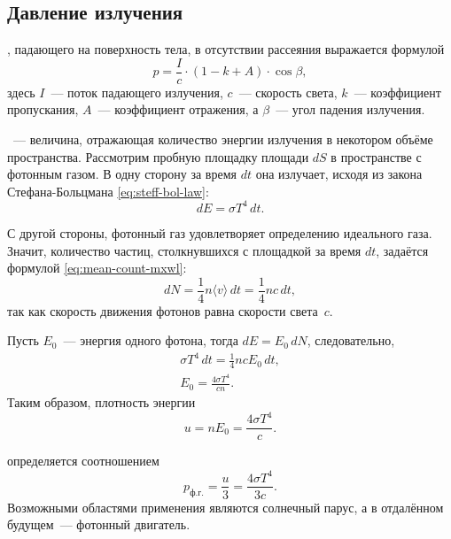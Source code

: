 \subsection{Давление излучения}
\label{sec:light-pressure}
, падающего на поверхность тела, в отсутствии рассеяния выражается формулой
\begin{equation}
    p = \frac{I}{c} \cdot (1 - k + A) \cdot \cos \beta,
\end{equation}
здесь $I$~--- поток падающего излучения, $c$~--- скорость света, $k$~--- коэффициент пропускания, $A$~--- коэффициент отражения, а $\beta$~--- угол падения излучения.

~--- величина, отражающая количество энергии излучения в некотором объёме пространства. Рассмотрим пробную площадку площади $dS$ в пространстве с фотонным газом. В одну сторону за время $dt$ она излучает, исходя из закона Стефана-Больцмана \eqref{eq:steff-bol-law}:
\begin{equation*}
	d E = \sigma T^4 \, d t.
\end{equation*}

С другой стороны, фотонный газ удовлетворяет определению идеального газа. Значит, количество частиц, столкнувшихся с площадкой за время $dt$, задаётся формулой \eqref{eq:mean-count-mxwl}:
\begin{equation*}
d N = \frac{1}{4} n \langle v \rangle \, d t = \frac{1}{4} n c \, d t,
\end{equation*}
так как скорость движения фотонов равна скорости света~$c$.

Пусть $E_0$~--- энергия одного фотона, тогда $dE = E_0\,dN$, следовательно,
\begin{gather*}
    \sigma T^4 \, dt = \frac{1}{4} n c E_0 \, dt,\\
    E_0 = \frac{4 \sigma T^4}{c n}.
\end{gather*}
Таким образом, плотность энергии
\begin{equation}
	u = n E_0 = \frac{4 \sigma T^4}{c}.
	\label{eq:photon-gas-energy-density}
\end{equation}

 определяется соотношением
\begin{equation}
    p_\text{ф.г.} = \frac{u}{3} = \frac{4 \sigma T^4}{3c}.
\end{equation}
Возможными областями применения являются солнечный парус, а в отдалённом будущем~--- фотонный двигатель.
